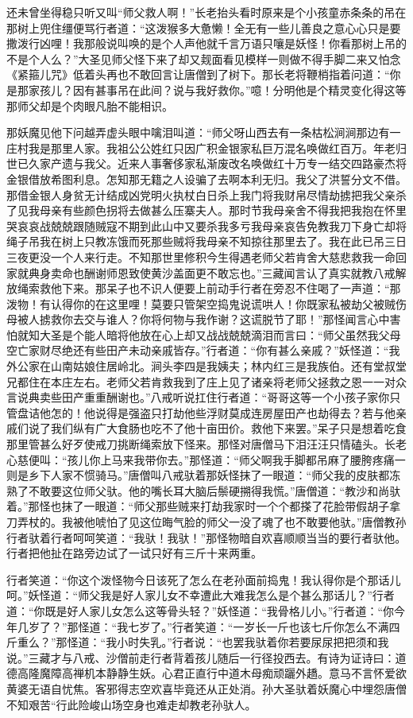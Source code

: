 \documentclass[12pt,UTF8]{ctexbook}
\begin{document}
还未曾坐得稳只听又叫“师父救人啊！”长老抬头看时原来是个小孩童赤条条的吊在那树上兜住缰便骂行者道：“这泼猴多大惫懒！全无有一些儿善良之意心心只是要撒泼行凶哩！我那般说叫唤的是个人声他就千言万语只嚷是妖怪！你看那树上吊的不是个人么？”大圣见师父怪下来了却又觌面看见模样一则做不得手脚二来又怕念《紧箍儿咒》低着头再也不敢回言让唐僧到了树下。那长老将鞭梢指着问道：“你是那家孩儿？因有甚事吊在此间？说与我好救你。”噫！分明他是个精灵变化得这等那师父却是个肉眼凡胎不能相识。

那妖魔见他下问越弄虚头眼中噙泪叫道：“师父呀山西去有一条枯松涧涧那边有一庄村我是那里人家。我祖公公姓红只因广积金银家私巨万混名唤做红百万。年老归世已久家产遗与我父。近来人事奢侈家私渐废改名唤做红十万专一结交四路豪杰将金银借放希图利息。怎知那无籍之人设骗了去啊本利无归。我父了洪誓分文不借。那借金银人身贫无计结成凶党明火执杖白日杀上我门将我财帛尽情劫掳把我父亲杀了见我母亲有些颜色拐将去做甚么压寨夫人。那时节我母亲舍不得我把我抱在怀里哭哀哀战兢兢跟随贼寇不期到此山中又要杀我多亏我母亲哀告免教我刀下身亡却将绳子吊我在树上只教冻饿而死那些贼将我母亲不知掠往那里去了。我在此已吊三日三夜更没一个人来行走。不知那世里修积今生得遇老师父若肯舍大慈悲救我一命回家就典身卖命也酬谢师恩致使黄沙盖面更不敢忘也。”三藏闻言认了真实就教八戒解放绳索救他下来。那呆子也不识人便要上前动手行者在旁忍不住喝了一声道：“那泼物！有认得你的在这里哩！莫要只管架空捣鬼说谎哄人！你既家私被劫父被贼伤母被人掳救你去交与谁人？你将何物与我作谢？这谎脱节了耶！”那怪闻言心中害怕就知大圣是个能人暗将他放在心上却又战战兢兢滴泪而言曰：“师父虽然我父母空亡家财尽绝还有些田产未动亲戚皆存。”行者道：“你有甚么亲戚？”妖怪道：“我外公家在山南姑娘住居岭北。涧头李四是我姨夫；林内红三是我族伯。还有堂叔堂兄都住在本庄左右。老师父若肯救我到了庄上见了诸亲将老师父拯救之恩一一对众言说典卖些田产重重酬谢也。”八戒听说扛住行者道：“哥哥这等一个小孩子家你只管盘诘他怎的！他说得是强盗只打劫他些浮财莫成连房屋田产也劫得去？若与他亲戚们说了我们纵有广大食肠也吃不了他十亩田价。救他下来罢。”呆子只是想着吃食那里管甚么好歹使戒刀挑断绳索放下怪来。那怪对唐僧马下泪汪汪只情磕头。长老心慈便叫：“孩儿你上马来我带你去。”那怪道：“师父啊我手脚都吊麻了腰胯疼痛一则是乡下人家不惯骑马。”唐僧叫八戒驮着那妖怪抹了一眼道：“师父我的皮肤都冻熟了不敢要这位师父驮。他的嘴长耳大脑后鬃硬搠得我慌。”唐僧道：“教沙和尚驮着。”那怪也抹了一眼道：“师父那些贼来打劫我家时一个个都搽了花脸带假胡子拿刀弄杖的。我被他唬怕了见这位晦气脸的师父一没了魂了也不敢要他驮。”唐僧教孙行者驮着行者呵呵笑道：“我驮！我驮！”那怪物暗自欢喜顺顺当当的要行者驮他。行者把他扯在路旁边试了一试只好有三斤十来两重。

行者笑道：“你这个泼怪物今日该死了怎么在老孙面前捣鬼！我认得你是个那话儿呵。”妖怪道：“师父我是好人家儿女不幸遭此大难我怎么是个甚么那话儿？”行者道：“你既是好人家儿女怎么这等骨头轻？”妖怪道：“我骨格儿小。”行者道：“你今年几岁了？”那怪道：“我七岁了。”行者笑道：“一岁长一斤也该七斤你怎么不满四斤重么？”那怪道：“我小时失乳。”行者说：“也罢我驮着你若要尿尿把把须和我说。”三藏才与八戒、沙僧前走行者背着孩儿随后一行径投西去。有诗为证诗曰：道德高隆魔障高禅机本静静生妖。心君正直行中道木母痴顽躧外趫。意马不言怀爱欲黄婆无语自忧焦。客邪得志空欢喜毕竟还从正处消。孙大圣驮着妖魔心中埋怨唐僧不知艰苦“行此险峻山场空身也难走却教老孙驮人。
\end{document}

